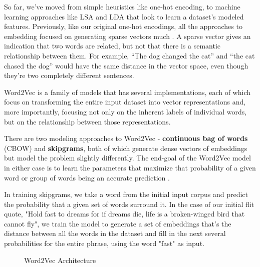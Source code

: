 \documentclass[11pt, table]{diazessay} %
\begin{document}
\begin{sloppypar}
So far, we've moved from simple heuristics like one-hot encoding, to machine learning approaches like LSA and LDA that look to learn a dataset's modeled features.  Previously, like our original one-hot encodings, all the approaches to embedding focused on generating sparse vectors much . A sparse vector gives an indication that two words are related, but not that there is a semantic relationship between them. For example, “The dog changed the cat” and “the cat chased the dog” would have the same distance in the vector space, even though they’re two completely different sentences.

Word2Vec is a family of models that has several implementations, each of which focus on transforming the entire input dataset into vector representations and, more importantly, focusing  not only on the inherent labels of individual words, but on the relationship between those representations.

There are two modeling approaches to Word2Vec - \textbf{continuous bag of words} (CBOW) and \textbf{skipgrams}, both of which generate dense vectors of embeddings but model the problem slightly differently. The end-goal of the Word2Vec model in either case is to learn the parameters that maximize that probability of a given word or group of words being an accurate prediction \citep{goldberg2014word2vec}.

In training skipgrams, we take a word from the initial input corpus and predict the probability that a given set of words surround it. In the case of our initial flit quote, "Hold fast to dreams for if dreams die, life is a broken-winged bird that cannot fly", we train the model to generate a set of embeddings that's the distance between all the words in the dataset and fill in the next several probabilities for the entire phrase, using the word "fast" as input.  

\begin{figure}[H]
    	\caption{Word2Vec Architecture}
  	\end{figure}


\end{sloppypar}
\end{document}
